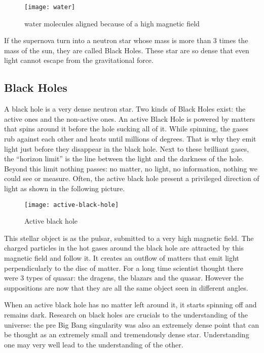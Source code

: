 \documentclass[a4paper, 11pt]{article} %
\begin{document}
\begin{figure}[h]
\centering
\texttt{[image: water]}
\caption{water molecules aligned because of a high magnetic field}
\label{water}
\end{figure}

If the supernova turn into a neutron star whose mass is more than 3 times the mass of the sun, they are called Black Holes. These star are so dense that even light cannot escape from the gravitational force. 

\subsection{Black Holes}
A black hole is a very dense neutron star. Two kinds of Black Holes exist: the active ones and the non-active ones. An active Black Hole is powered by matters that spins around it before the hole sucking all of it. While spinning, the gases rub against each other and heats until millions of degrees. That is why they emit light just before they disappear in the black hole. Next to these brilliant gases, the “horizon limit” is the line between the light and the darkness of the hole. Beyond this limit nothing passes: no matter, no light, no information, nothing we could see or measure. Often, the active black hole present a privileged direction of light as shown in the following picture.

\begin{figure}[h]
\centering
\texttt{[image: active-black-hole]}
\caption{Active black hole}
\end{figure}


This stellar object is as the pulsar, submitted to a very high magnetic field. The charged particles in the hot gases around the black hole are attracted by this magnetic field and follow it. It creates an outflow of matters that emit light perpendicularly to the disc of matter. For a long time scientist thought there were 3 types of quasar: the dragens, the blazars and the quasar. However the suppositions are now that they are all the same object seen in different angles.

When an active black hole has no matter left around it, it starts spinning off and remains dark. Research on black holes are crucials to the understanding of the universe: the pre Big Bang singularity was also an extremely dense point that can be thought as an extremely small and tremendously dense star. Understanding one may very well lead to the understanding of the other. 
\end{document}
